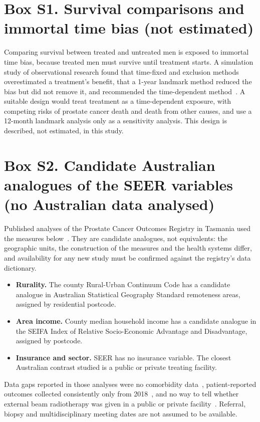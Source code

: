 \documentclass[10pt,a4paper]{article}
\begin{document}
\section{Box S1. Survival comparisons and immortal time bias (not estimated)}
Comparing survival between treated and untreated men is exposed to immortal time bias, because treated men must survive until treatment starts. A simulation study of observational research found that time-fixed and exclusion methods overestimated a treatment's benefit, that a 1-year landmark method reduced the bias but did not remove it, and recommended the time-dependent method~\cite{zheng2023}. A suitable design would treat treatment as a time-dependent exposure, with competing risks of prostate cancer death and death from other causes, and use a 12-month landmark analysis only as a sensitivity analysis. This design is described, not estimated, in this study.

\section{Box S2. Candidate Australian analogues of the SEER variables (no Australian data analysed)}
Published analyses of the Prostate Cancer Outcomes Registry in Tasmania used the measures below~\cite{foley2022,foley2025}. They are candidate analogues, not equivalents: the geographic units, the construction of the measures and the health systems differ, and availability for any new study must be confirmed against the registry's data dictionary.
\begin{itemize}
\item \textbf{Rurality.} The county Rural-Urban Continuum Code has a candidate analogue in Australian Statistical Geography Standard remoteness areas, assigned by residential postcode.
\item \textbf{Area income.} County median household income has a candidate analogue in the SEIFA Index of Relative Socio-Economic Advantage and Disadvantage, assigned by postcode.
\item \textbf{Insurance and sector.} SEER has no insurance variable. The closest Australian contrast studied is a public or private treating facility.
\end{itemize}
Data gaps reported in those analyses were no comorbidity data~\cite{foley2022}, patient-reported outcomes collected consistently only from 2018~\cite{foley2025}, and no way to tell whether external beam radiotherapy was given in a public or private facility~\cite{foley2025}. Referral, biopsy and multidisciplinary meeting dates are not assumed to be available.
\end{document}
